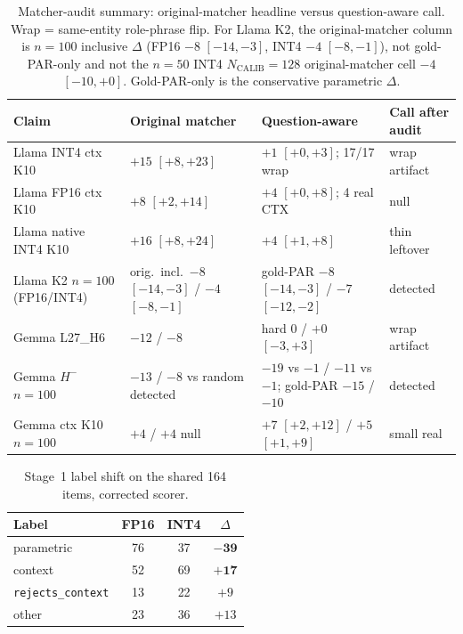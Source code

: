 \documentclass{article} %
\begin{document}
\begin{table}[h]
\caption{Matcher-audit summary: original-matcher headline versus question-aware call. Wrap = same-entity role-phrase flip. For Llama K2, the original-matcher column is $n{=}100$ inclusive $\Delta$ (FP16 $-8$ $[-14,-3]$, INT4 $-4$ $[-8,-1]$), not gold-PAR-only and not the $n{=}50$ INT4 $N_{\mathrm{CALIB}}{=}128$ original-matcher cell $-4$ $[-10,+0]$. Gold-PAR-only is the conservative parametric $\Delta$.}
\label{tab:artifact-summary}
\centering\scriptsize
\setlength{\tabcolsep}{2pt}
\begin{tabular}{lp{1.15in}p{1.45in}p{0.95in}}
\toprule
Claim & Original matcher & Question-aware & Call after audit \\
\midrule
Llama INT4 ctx K10 & $+15$ $[+8,+23]$ & $+1$ $[+0,+3]$; 17/17 wrap & wrap artifact \\
Llama FP16 ctx K10 & $+8$ $[+2,+14]$ & $+4$ $[+0,+8]$; 4 real CTX & null \\
Llama native INT4 K10 & $+16$ $[+8,+24]$ & $+4$ $[+1,+8]$ & thin leftover \\
Llama K2 $n{=}100$ (FP16/INT4) & orig.\ incl.\ $-8$ $[-14,-3]$ / $-4$ $[-8,-1]$ & gold-PAR $-8$ $[-14,-3]$ / $-7$ $[-12,-2]$ & detected \\
Gemma L27\_H6 & $-12$ / $-8$ & hard $0$ / $+0$ $[-3,+3]$ & wrap artifact \\
Gemma $H^{-}$ $n{=}100$ & $-13$ / $-8$ vs random detected & $-19$ vs $-1$ / $-11$ vs $-1$; gold-PAR $-15$ / $-10$ & detected \\
Gemma ctx K10 $n{=}100$ & $+4$ / $+4$ null & $+7$ $[+2,+12]$ / $+5$ $[+1,+9]$ & small real \\
\bottomrule
\end{tabular}
\end{table}

\begin{table}[h]
\caption{Stage~1 label shift on the shared 164 items, corrected scorer.}
\label{tab:labels}
\centering\small
\begin{tabular}{lccc}
\toprule
Label & FP16 & INT4 & $\Delta$ \\
\midrule
parametric & 76 & 37 & $\mathbf{-39}$ \\
context & 52 & 69 & $\mathbf{+17}$ \\
\texttt{rejects\_context} & 13 & 22 & $+9$ \\
other & 23 & 36 & $+13$ \\
\bottomrule
\end{tabular}
\end{table}
\end{document}
